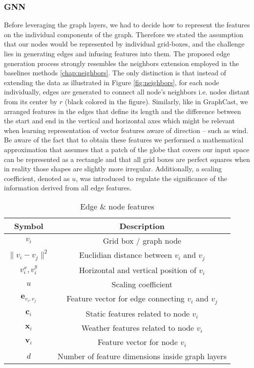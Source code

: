 

\subsubsection{GNN}
Before leveraging the graph layers, we had to decide how to represent the features on the individual components of the graph. Therefore we stated the assumption that our nodes would be represented by individual grid-boxes, and the challenge lies in generating edges and infusing features into them. The proposed edge generation process strongly resembles the neighbors extension employed in the baselines methods \ref{chap:neighbors}. The only distinction is that instead of extending the data as illustrated in Figure \ref{fig:neighbors}, for each node individually, edges are generated to connect all node's neighbors i.e. nodes distant from its center by $r$ (black colored in the figure). Similarly, like in GraphCast, we arranged features in the edges that define its length and the difference between the start and end in the vertical and horizontal axes which might be relevant when learning representation of vector features aware of direction -- such as wind. Be aware of the fact that to obtain these features we performed a mathematical approximation that assumes that a patch of the globe that covers our input space can be represented as a rectangle and that all grid boxes are perfect squares when in reality those shapes are slightly more irregular. Additionally, a scaling coefficient, denoted as $u$, was introduced to regulate the significance of the information derived from all edge features.
\renewcommand{\arraystretch}{1.25}
\begin{table}[!ht]
    \centering
    \begin{tabular}{|c|c|}
        \hline
        Symbol & Description \\
        \hline
        $v_{i}$ & Grid box / graph node\\
        $\|v_{i}-v_{j}\|^2$ & Euclidian distance between $v_i$ and $v_j$ \\
        $v_i^x,v_i^y$ & Horizontal and vertical position of $v_i$ \\
        $u$ & Scaling coefficient \\
        $\mathbf{e}_{v_i,v_j}$ & Feature vector for edge connecting $v_i$ and $v_j$ \\
        $\mathbf{c}_i$ & Static features related to node $v_i$ \\
        $\mathbf{x}_i$ & Weather features related to node $v_i$ \\
        $\mathbf{v}_i$ & Feature vector for node $v_i$ \\
        $d$ & Number of feature dimensions inside graph layers \\
        \hline
    \end{tabular}
\caption{Edge \& node features}
\label{tab:edge_conv}
\end{table}
